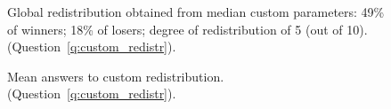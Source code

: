 \begin{figure}[h!]
    \caption[Median custom redistribution]{Global redistribution obtained from median custom parameters: 49\% of winners; 18\% of losers; degree of redistribution of 5 (out of 10). (Question~\ref{q:custom_redistr}).
    }\label{fig:custom_redistr_median}
\end{figure} 

\begin{figure}[h!]
    \caption[Answers to custom redistribution]{Mean answers to custom redistribution. (Question~\ref{q:custom_redistr}).
    }\label{fig:custom_redistr_all}
\end{figure} 

